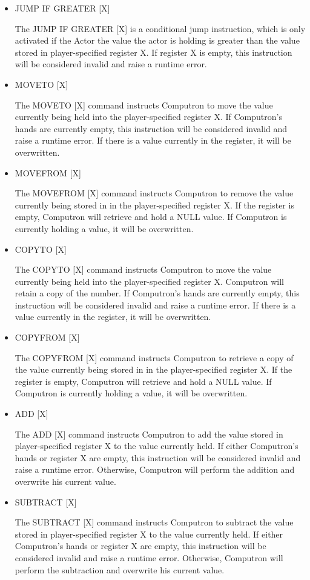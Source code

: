 \begin{itemize}
    \item JUMP IF GREATER [X]
    
    The JUMP IF GREATER [X] is a conditional jump instruction, which is only activated if the Actor the value the actor is holding is greater than the value stored in player-specified register X. If register X is empty, this instruction will be considered invalid and raise a runtime error.

    \item MOVETO [X]
    
    The MOVETO [X] command instructs Computron to move the value currently being held into the player-specified register X. If Computron's hands are currently empty, this instruction will be considered invalid and raise a runtime error. If there is a value currently in the register, it will be overwritten.

    \item MOVEFROM [X]
    
    The MOVEFROM [X] command instructs Computron to remove the value currently being stored in in the player-specified register X. If the register is empty, Computron will retrieve and hold a NULL value. If Computron is currently holding a value, it will be overwritten.

    \item COPYTO [X]
    
    The COPYTO [X] command instructs Computron to move the value currently being held into the player-specified register X. Computron will retain a copy of the number. If Computron's hands are currently empty, this instruction will be considered invalid and raise a runtime error. If there is a value currently in the register, it will be overwritten.

    \item COPYFROM [X]
    
    The COPYFROM [X] command instructs Computron to retrieve a copy of the value currently being stored in in the player-specified register X. If the register is empty, Computron will retrieve and hold a NULL value. If Computron is currently holding a value, it will be overwritten.

    \item ADD [X]
    
    The ADD [X] command instructs Computron to add the value stored in player-specified register X to the value currently held. If either Computron's hands or register X are empty, this instruction will be considered invalid and raise a runtime error. Otherwise, Computron will perform the addition and overwrite his current value.

    \item SUBTRACT [X]
    
    The SUBTRACT [X] command instructs Computron to subtract the value stored in player-specified register X to the value currently held. If either Computron's hands or register X are empty, this instruction will be considered invalid and raise a runtime error. Otherwise, Computron will perform the subtraction and overwrite his current value.
\end{itemize}

